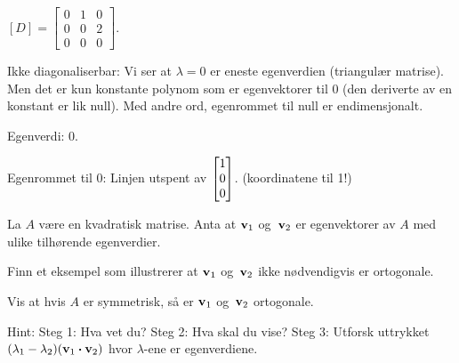 \begin{losning}

\begin{punkt}
$[D]=\begin{bmatrix}
0 & 1 & 0\\
0 & 0 & 2\\
0 & 0 & 0
\end{bmatrix}$.
\end{punkt}

\begin{punkt}
Ikke diagonaliserbar: Vi ser at $\lambda=0$ er eneste egenverdien (triangulær matrise). Men det er kun konstante polynom som er egenvektorer til 0 (den deriverte av en konstant er lik null). Med andre ord, egenrommet til null er endimensjonalt.
\end{punkt}

\begin{punkt}
Egenverdi: 0.

\noindent
Egenrommet til 0: Linjen utspent av $\begin{bmatrix} 1 \\ 0 \\ 0 \end{bmatrix}$. (koordinatene til 1!)
\end{punkt}


\end{losning}

\begin{oppgave}
La $A$ være en kvadratisk matrise. Anta at $\mathbf{v}_1$ og~$\mathbf{v}_2$ er egenvektorer av $A$ med ulike tilhørende egenverdier.

\begin{punkt}
Finn et eksempel som illustrerer at $\mathbf{v}_1$ og~$\mathbf{v}_2$ ikke nødvendigvis er ortogonale.
\end{punkt}

\begin{punkt}
Vis at hvis $A$ er symmetrisk, så er $\mathbf{v}_1$ og~$\mathbf{v}_2$ ortogonale.

\noindent
Hint: Steg 1: Hva vet du? Steg 2: Hva skal du vise? Steg 3: Utforsk uttrykket $(\lambda_1-\lambda_2)(\mathbf{v}_1\boldsymbol{\cdot}\mathbf{v}_2)$ hvor $\lambda$-ene er egenverdiene.
\end{punkt}

\end{oppgave}


